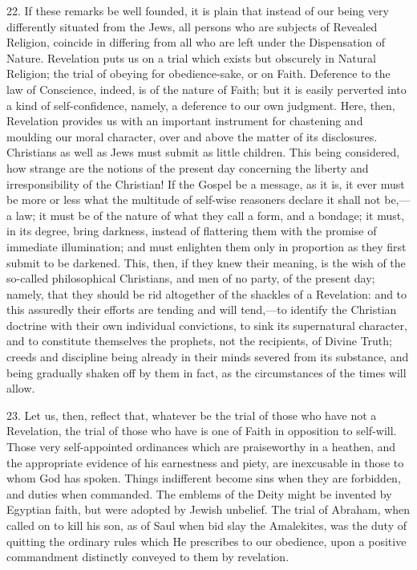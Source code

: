 22. If these remarks be well founded, it is plain that instead of
our being very differently situated from the Jews, all persons who are
subjects of Revealed Religion, coincide in differing from all who are
left under the Dispensation of Nature. Revelation puts us on a trial
which exists but obscurely in Natural Religion; the trial of obeying
for obedience-sake, or on Faith. Deference to the law of Conscience,
indeed, is of the nature of Faith; but it is easily perverted into a
kind of self-confidence, namely, a deference to our own judgment.
Here, then, Revelation provides us with an important instrument for
chastening and moulding our moral character, over and above the matter
of its disclosures. Christians as well as Jews must submit as little
children. This being considered, how strange are the notions of the
present day concerning the liberty and irresponsibility of the
Christian! If the Gospel be a message, as it is, it ever must be more
or less what the multitude of self-wise reasoners declare it shall not
be,—a law; it must be of the nature of what they call a form, and a
bondage; it must, in its degree, bring darkness, instead of flattering
them with the promise of immediate illumination; and must enlighten
them only in proportion as they first submit to be darkened. This,
then, if they knew their meaning, is the wish of the so-called
philosophical Christians, and men of no party, of the present day;
namely, that they should be rid altogether of the shackles of a
Revelation: and to this assuredly their efforts are tending and will
tend,—to identify the Christian doctrine with their own individual
convictions, to sink its supernatural character, and to constitute
themselves the prophets, not the recipients, of Divine Truth; creeds
and discipline being already in their minds severed from its
substance, and being gradually shaken off by them in fact, as the
circumstances of the times will allow.

23. Let us, then, reflect that, whatever be the trial of those who
have not a Revelation, the trial of those who have is one of Faith in
opposition to self-will. Those very self-appointed ordinances which
are praiseworthy in a heathen, and the appropriate evidence of his
earnestness and piety, are inexcusable in those to whom God has
spoken. Things indifferent become sins when they are forbidden, and
duties when commanded. The emblems of the Deity might be invented by
Egyptian faith, but were adopted by Jewish unbelief. The trial of
Abraham, when called on to kill his son, as of Saul when bid slay the
Amalekites, was the duty of quitting the ordinary rules which He
prescribes to our obedience, upon a positive commandment distinctly
conveyed to them by revelation.

